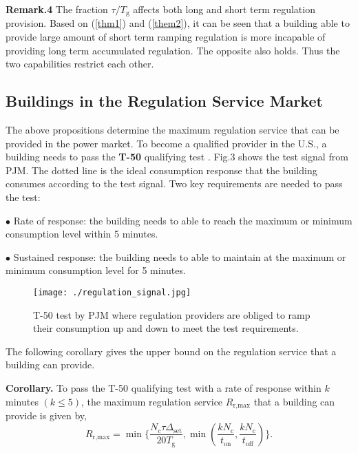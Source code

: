 \documentclass[journal]{IEEEtran}
\begin{document}
\textbf{Remark.4} The fraction $\tau/T_{\textrm{g}}$ affects both long and short term regulation provision. Based on (\ref{thm1}) and (\ref{them2}), it can be seen that a building able to provide large amount of short term ramping regulation is more incapable of providing long term accumulated regulation. The opposite also holds. Thus the two capabilities restrict each other.

\subsection{Buildings in the Regulation Service Market}
The above propositions determine the maximum regulation service that can be provided in the power market. To become a qualified provider in the U.S., a building needs to pass the \textbf{T-50} qualifying test \cite{PJM}. Fig.3 shows the test signal from PJM. The dotted line is the ideal consumption response that the building consumes according to the test signal. Two key requirements are needed to pass the test:

$\bullet$ Rate of response: the building needs to able to reach the maximum or minimum consumption level within 5 minutes.

$\bullet$ Sustained response: the building needs to able to maintain at the maximum or minimum consumption level for 5 minutes. 

\begin{figure}[htb]
\centering
\label{regulation_signal}
\texttt{[image: ./regulation\_signal.jpg]}
\caption{T-50 test by PJM where regulation providers are obliged to ramp their consumption up and down to meet the test requirements.}
\end{figure}

The following corollary gives the upper bound on the regulation service that a building can provide.

\textbf{Corollary.} To pass the T-50 qualifying test with a rate of response within $k$ minutes $(k\leq 5)$, the maximum regulation service $R_{\textrm{r,max}}$ that a building can provide is given by,
\begin{equation}
\label{corollary bound}
R_{\textrm{r,max}}=\min \biggl\{\frac{N_{c}\tau\Delta_{\textrm{set}}}{20 T_{\textrm{g}}},\min(\frac{k N_{\textrm{c}}}{t_{\textrm{on}}}, \frac{k N_{\textrm{c}}}{t_{\textrm{off}}})\biggr\}.
\end{equation}
\end{document}
